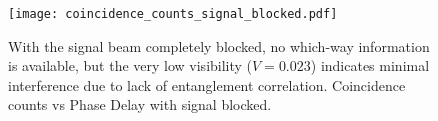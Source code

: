 \documentclass{article}
\begin{document}
\begin{figure}[h!]
\centering
\texttt{[image: coincidence\_counts\_signal\_blocked.pdf]}
\caption{
  With the signal beam completely blocked, no which-way information is available,
  but the very low visibility ($V=0.023$) indicates minimal interference due to
  lack of entanglement correlation. Coincidence counts vs Phase Delay with signal blocked.
}
\end{figure}
\end{document}
